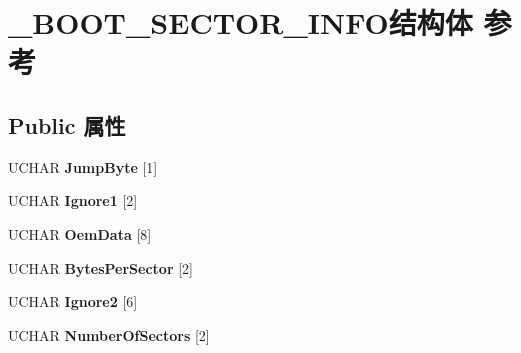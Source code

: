 \hypertarget{struct___b_o_o_t___s_e_c_t_o_r___i_n_f_o}{}\section{\+\_\+\+B\+O\+O\+T\+\_\+\+S\+E\+C\+T\+O\+R\+\_\+\+I\+N\+F\+O结构体 参考}
\label{struct___b_o_o_t___s_e_c_t_o_r___i_n_f_o}
\subsection*{Public 属性}
\begin{DoxyCompactItemize}
\item 
\mbox{\label{struct___b_o_o_t___s_e_c_t_o_r___i_n_f_o_a5005206118e62d541f27aa79685475ea}} 
U\+C\+H\+AR {\bfseries Jump\+Byte} \mbox{[}1\mbox{]}
\item 
\mbox{\label{struct___b_o_o_t___s_e_c_t_o_r___i_n_f_o_a8c4370b0f9ab984a6195a01706e26205}} 
U\+C\+H\+AR {\bfseries Ignore1} \mbox{[}2\mbox{]}
\item 
\mbox{\label{struct___b_o_o_t___s_e_c_t_o_r___i_n_f_o_a4e25c2ebc25c896bc95348ca43267f61}} 
U\+C\+H\+AR {\bfseries Oem\+Data} \mbox{[}8\mbox{]}
\item 
\mbox{\label{struct___b_o_o_t___s_e_c_t_o_r___i_n_f_o_a03fed6d1f63c8cf52434fea929b2c8e9}} 
U\+C\+H\+AR {\bfseries Bytes\+Per\+Sector} \mbox{[}2\mbox{]}
\item 
\mbox{\label{struct___b_o_o_t___s_e_c_t_o_r___i_n_f_o_a26d863efa26224b28aba3e122b4896d5}} 
U\+C\+H\+AR {\bfseries Ignore2} \mbox{[}6\mbox{]}
\item 
\mbox{\label{struct___b_o_o_t___s_e_c_t_o_r___i_n_f_o_a80bf64142a84b456c2d7e3bbe032a6f0}} 
U\+C\+H\+AR {\bfseries Number\+Of\+Sectors} \mbox{[}2\mbox{]}
\item 
\mbox{\label{struct___b_o_o_t___s_e_c_t_o_r___i_n_f_o_a2c1208a98a8f08b34331a4c55ee205c8}} 

\end{DoxyCompactItemize}
